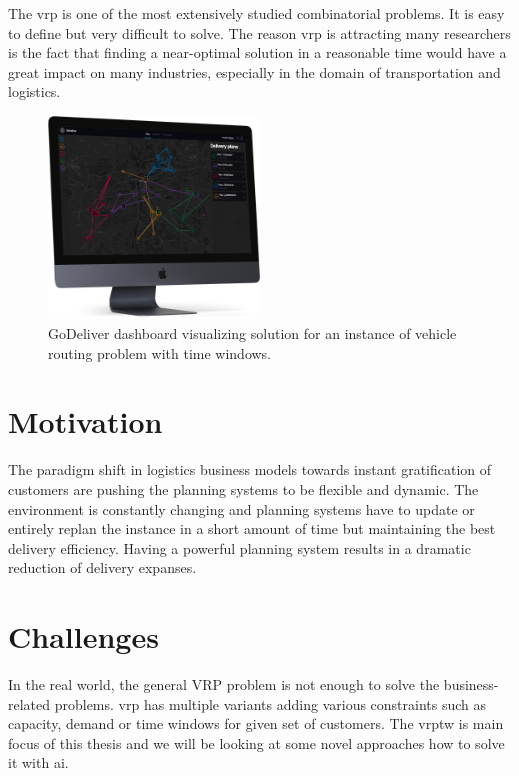 \begin{introduction}
    The \gls{vrp} is one of the most extensively studied combinatorial problems. It is easy to define but very difficult to solve\cite{time-complexity-vrp}. The reason \gls{vrp} is attracting many researchers is the fact that finding a near-optimal solution in a reasonable time would have a great impact on many industries, especially in the domain of transportation and logistics. 
    
    \begin{figure}[ht]
        \centering
        \includegraphics[width=0.5\textwidth]{resources/intro/godeliver-dashboard.png}
        \caption{GoDeliver dashboard visualizing solution for an instance of vehicle routing problem with time windows.}
        \label{fig:godeliver_dashboard}
    \end{figure}
    
    \section{Motivation}
    The paradigm shift in logistics business models towards instant gratification of customers are pushing the planning systems to be flexible and dynamic. The environment is constantly changing and planning systems have to update or entirely replan the instance in a short amount of time but maintaining the best delivery efficiency. Having a powerful planning system results in a dramatic reduction of delivery expanses.
    
    \section{Challenges}
    In the real world, the general VRP problem is not enough to solve the business-related problems. \gls{vrp} has multiple variants adding various constraints such as capacity, demand or time windows for given set of customers. The \gls{vrptw} is main focus of this thesis and we will be looking at some novel approaches how to solve it with \gls{ai}.
    

\end{introduction}
